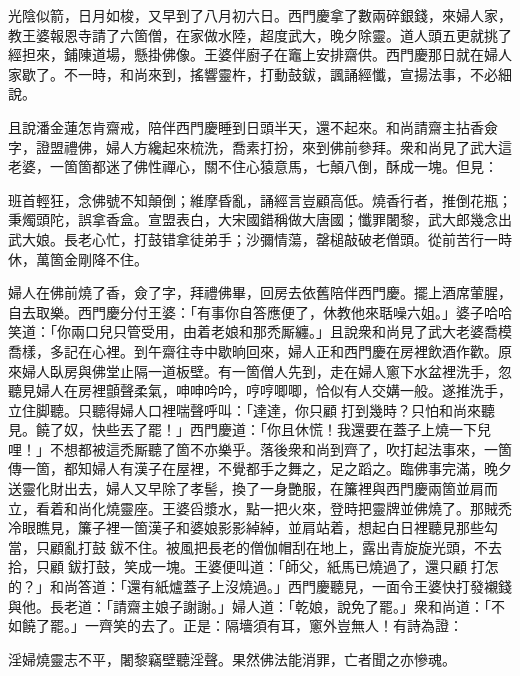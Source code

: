 光陰似箭，日月如梭，又早到了八月初六日。西門慶拿了數兩碎銀錢，來婦人家，教王婆報恩寺請了六箇僧，在家做水陸，超度武大，晚夕除靈。道人頭五更就挑了經担來，鋪陳道場，懸掛佛像。王婆伴廚子在竈上安排齋供。西門慶那日就在婦人家歇了。不一時，和尚來到，搖響靈杵，打動鼓鈸，諷誦經懺，宣揚法事，不必細說。

且說潘金蓮怎肯齋戒，陪伴西門慶睡到日頭半天，還不起來。和尚請齋主拈香僉字，證盟禮佛，婦人方纔起來梳洗，喬素打扮，來到佛前參拜。衆和尚見了武大這老婆，一箇箇都迷了佛性禪心，關不住心猿意馬，七顛八倒，酥成一塊。但見：

\begin{myquote} 
班首輕狂，念佛號不知顛倒；維摩昏亂，誦經言豈顧高低。燒香行者，推倒花瓶；秉燭頭陀，誤拿香盒。宣盟表白，大宋國錯稱做大唐國；懺罪闍黎，武大郎幾念出武大娘。長老心忙，打鼓错拿徒弟手；沙彌情蕩，罄槌敲破老僧頭。從前苦行一時休，萬箇金剛降不住。
\end{myquote} 

婦人在佛前燒了香，僉了字，拜禮佛畢，回房去依舊陪伴西門慶。擺上酒席葷腥，自去取樂。西門慶分付王婆：「有事你自答應便了，休教他來聒噪六姐。」婆子哈哈笑道：「你兩口兒只管受用，由着老娘和那禿厮纏。」{}且說衆和尚見了武大老婆喬模喬樣，多記在心裡。到午齋往寺中歇晌回來，婦人正和西門慶在房裡飲酒作歡。原來婦人臥房與佛堂止隔一道板壁。有一箇僧人先到，走在婦人窻下水盆裡洗手，忽聽見婦人在房裡顫聲柔氣，呻呻吟吟，哼哼唧唧，恰似有人交媾一般。遂推洗手，立住脚聽。{}{}只聽得婦人口裡喘聲呼叫：「達達，你只顧𢵞打到幾時？只怕和尚來聽見。饒了奴，快些丟了罷！」西門慶道：「你且休慌！我還要在蓋子上燒一下兒哩！」不想都被這禿厮聽了箇不亦樂乎。落後衆和尚到齊了，吹打起法事來，一箇傳一箇，都知婦人有漢子在屋裡，不覺都手之舞之，足之蹈之。臨佛事完滿，晚夕送靈化財出去，婦人又早除了孝髻，換了一身艷服，在簾裡與西門慶兩箇並肩而立，看着和尚化燒靈座。王婆舀漿水，點一把火來，登時把靈牌並佛燒了。那賊禿冷眼瞧見，簾子裡一箇漢子和婆娘影影綽綽，並肩站着，想起白日裡聽見那些勾當，只顧亂打鼓𢵞鈸不住。被風把長老的僧伽帽刮在地上，露出青旋旋光頭，不去拾，只顧𢵞鈸打鼓，笑成一塊。{}王婆便叫道：「師父，紙馬已燒過了，還只顧𢵞打怎的？」和尚答道：「還有紙爐蓋子上沒燒過。」西門慶聽見，一面令王婆快打發襯錢與他。長老道：「請齋主娘子謝謝。」婦人道：「乾娘，說免了罷。」衆和尚道：「不如饒了罷。」一齊笑的去了。正是：隔墻須有耳，窻外豈無人！有詩為證：

\begin{myquote} 
淫婦燒靈志不平，闍黎竊壁聽淫聲。果然佛法能消罪，亡者聞之亦慘魂。
\end{myquote} 

